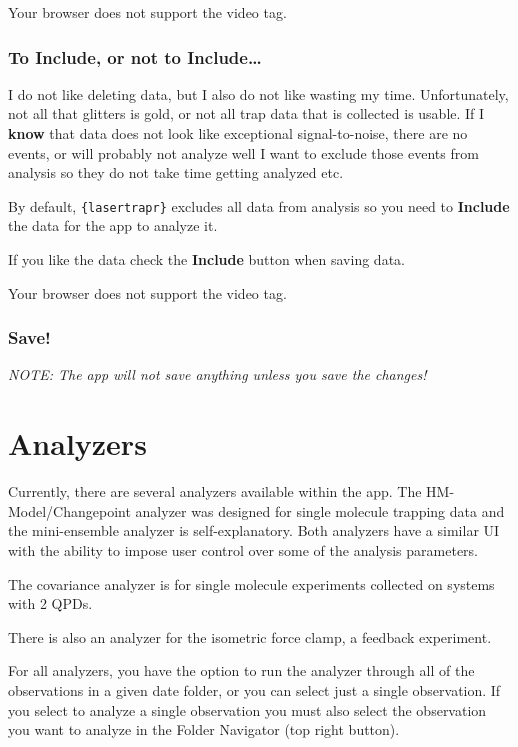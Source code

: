 \documentclass[
]{book}
\begin{document}
Your browser does not support the video tag.

\subsection{To Include, or not to Include\ldots{}}\label{to-include-or-not-to-include}

I do not like deleting data, but I also do not like wasting my time. Unfortunately, not all that glitters is gold, or not all trap data that is collected is usable. If I \textbf{know} that data does not look like exceptional signal-to-noise, there are no events, or will probably not analyze well I want to exclude those events from analysis so they do not take time getting analyzed etc.

By default, \texttt{\{lasertrapr\}} excludes all data from analysis so you need to \textbf{Include} the data for the app to analyze it.

If you like the data check the \textbf{Include} button when saving data.

Your browser does not support the video tag.

\subsection{Save!}\label{save}

\emph{NOTE: The app will not save anything unless you save the changes!}

\chapter{Analyzers}\label{analyzers}

Currently, there are several analyzers available within the app. The HM-Model/Changepoint analyzer was designed for single molecule trapping data and the mini-ensemble analyzer is self-explanatory. Both analyzers have a similar UI with the ability to impose user control over some of the analysis parameters.

The covariance analyzer is for single molecule experiments collected on systems with 2 QPDs.

There is also an analyzer for the isometric force clamp, a feedback experiment.

For all analyzers, you have the option to run the analyzer through all of the observations in a given date folder, or you can select just a single observation. If you select to analyze a single observation you must also select the observation you want to analyze in the Folder Navigator (top right button).
\end{document}
